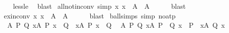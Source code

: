 \begin{isabellebody}
%
\isadelimproof
\ \ %
\endisadelimproof
%
\isatagproof
{}\isamarkupfalse%
\ less{\isacharunderscore}{\kern0pt}le\ \isamarkupfalse%
\ blast%
\endisatagproof
{\isafoldproof}%
%
\isadelimproof
\isanewline
%
\endisadelimproof
\isanewline
{}\isamarkupfalse%
\ all{\isacharunderscore}{\kern0pt}not{\isacharunderscore}{\kern0pt}in{\isacharunderscore}{\kern0pt}conv\ {\isacharbrackleft}{\kern0pt}simp{\isacharbrackright}{\kern0pt}{\isacharcolon}{\kern0pt}\ {\isachardoublequoteopen}{\isacharparenleft}{\kern0pt}{\isasymforall}x{\isachardot}{\kern0pt}\ x\ {\isasymnotin}\ A{\isacharparenright}{\kern0pt}\ {\isasymlongleftrightarrow}\ A\ {\isacharequal}{\kern0pt}\ {\isacharbraceleft}{\kern0pt}{\isacharbraceright}{\kern0pt}{\isachardoublequoteclose}\isanewline
%
\isadelimproof
\ \ %
\endisadelimproof
%
\isatagproof
{}\isamarkupfalse%
\ blast%
\endisatagproof
{\isafoldproof}%
%
\isadelimproof
\isanewline
%
\endisadelimproof
\isanewline
{}\isamarkupfalse%
\ ex{\isacharunderscore}{\kern0pt}in{\isacharunderscore}{\kern0pt}conv{\isacharcolon}{\kern0pt}\ {\isachardoublequoteopen}{\isacharparenleft}{\kern0pt}{\isasymexists}x{\isachardot}{\kern0pt}\ x\ {\isasymin}\ A{\isacharparenright}{\kern0pt}\ {\isasymlongleftrightarrow}\ A\ {\isasymnoteq}\ {\isacharbraceleft}{\kern0pt}{\isacharbraceright}{\kern0pt}{\isachardoublequoteclose}\isanewline
%
\isadelimproof
\ \ %
\endisadelimproof
%
\isatagproof
{}\isamarkupfalse%
\ blast%
\endisatagproof
{\isafoldproof}%
%
\isadelimproof
\isanewline
%
\endisadelimproof
\isanewline
{}\isamarkupfalse%
\ ball{\isacharunderscore}{\kern0pt}simps\ {\isacharbrackleft}{\kern0pt}simp{\isacharcomma}{\kern0pt}\ no{\isacharunderscore}{\kern0pt}atp{\isacharbrackright}{\kern0pt}{\isacharcolon}{\kern0pt}\isanewline
\ \ {\isachardoublequoteopen}{\isasymAnd}A\ P\ Q{\isachardot}{\kern0pt}\ {\isacharparenleft}{\kern0pt}{\isasymforall}x{\isasymin}A{\isachardot}{\kern0pt}\ P\ x\ {\isasymor}\ Q{\isacharparenright}{\kern0pt}\ {\isasymlongleftrightarrow}\ {\isacharparenleft}{\kern0pt}{\isacharparenleft}{\kern0pt}{\isasymforall}x{\isasymin}A{\isachardot}{\kern0pt}\ P\ x{\isacharparenright}{\kern0pt}\ {\isasymor}\ Q{\isacharparenright}{\kern0pt}{\isachardoublequoteclose}\isanewline
\ \ {\isachardoublequoteopen}{\isasymAnd}A\ P\ Q{\isachardot}{\kern0pt}\ {\isacharparenleft}{\kern0pt}{\isasymforall}x{\isasymin}A{\isachardot}{\kern0pt}\ P\ {\isasymor}\ Q\ x{\isacharparenright}{\kern0pt}\ {\isasymlongleftrightarrow}\ {\isacharparenleft}{\kern0pt}P\ {\isasymor}\ {\isacharparenleft}{\kern0pt}{\isasymforall}x{\isasymin}A{\isachardot}{\kern0pt}\ Q\ x{\isacharparenright}{\kern0pt}{\isacharparenright}{\kern0pt}{\isachardoublequoteclose}\isanewline

\end{isabellebody}
